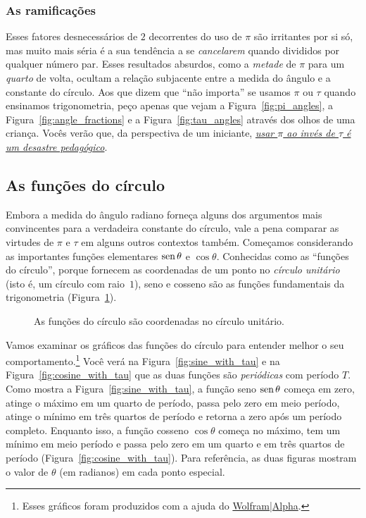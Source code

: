     \subsubsection{As ramificações} %
    \label{sec:the_ramifications}


Esses fatores desnecessários de $2$ decorrentes do uso de $\pi$ são irritantes por si só, mas muito mais séria é a sua tendência a se \emph{cancelarem} quando divididos por qualquer número par. Esses resultados absurdos, como a \emph{metade} de $\pi$ para um \emph{quarto} de volta, ocultam a relação subjacente entre a medida do ângulo e a constante do círculo. Aos que dizem que ``não importa'' se usamos $\pi$ ou $\tau$ quando ensinamos trigonometria, peço apenas que vejam a Figura~\ref{fig:pi_angles}, a Figura~\ref{fig:angle_fractions} e a Figura~\ref{fig:tau_angles} através dos olhos de uma criança. Vocês verão que, da perspectiva de um iniciante, \href{https://tauday.com/a-tau-testimonial}{\emph{usar $\pi$ ao invés de $\tau$ é um desastre pedagógico}}.

  \subsection{As funções do círculo} %
  \label{sec:the_circle_functions}

Embora a medida do ângulo radiano forneça alguns dos argumentos mais convincentes para a verdadeira constante do círculo, vale a pena comparar as virtudes de $\pi$ e $\tau$ em alguns outros contextos também. Começamos considerando as importantes funções elementares $\mbox{sen}\,\theta$ e $\cos\theta$. Conhecidas como as ``funções do círculo'', porque fornecem as coordenadas de um ponto no \emph{círculo unitário} (isto é, um círculo com raio~$1$), seno e cosseno são as funções fundamentais da trigonometria (Figura~\ref{fig:circle_functions}).

\begin{figure}
\begin{center}
\end{center}
\caption{As funções do círculo são coordenadas no círculo unitário.\label{fig:circle_functions}}
\end{figure}

Vamos examinar os gráficos das funções do círculo para entender melhor o seu comportamento.\footnote{Esses gráficos foram produzidos com a ajuda do \href{https://www.wolframalpha.com/}{Wolfram|Alpha}.} Você verá na Figura~\ref{fig:sine_with_tau} e na Figura~\ref{fig:cosine_with_tau} que as duas funções são \emph{periódicas} com período $T$. Como mostra a Figura~\ref{fig:sine_with_tau}, a função seno $\mbox{sen}\,\theta$ começa em zero, atinge o máximo em um quarto de período, passa pelo zero em meio período, atinge o mínimo em três quartos de período e retorna a zero após um período completo. Enquanto isso, a função cosseno $\cos\theta$ começa no máximo, tem um mínimo em meio período e passa pelo zero em um quarto e em três quartos de período (Figura~\ref{fig:cosine_with_tau}). Para referência, as duas figuras mostram o valor de $\theta$ (em radianos) em cada ponto especial.

